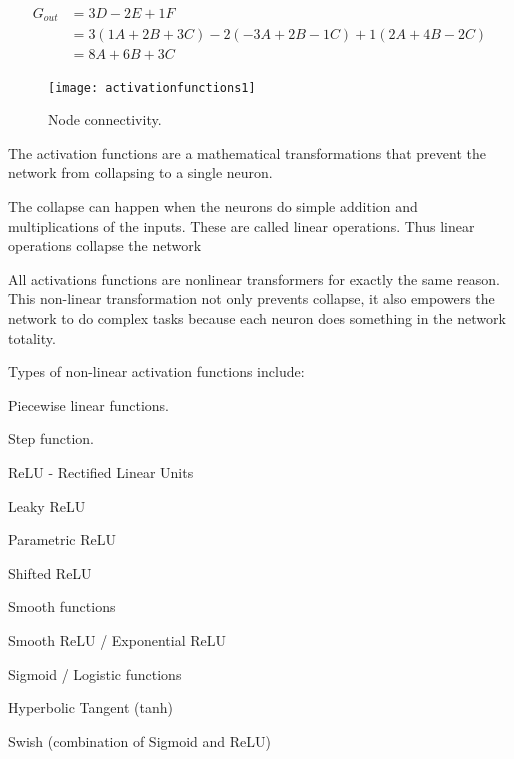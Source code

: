 	\begin{align}
		\begin{split}
		 G_{out}	& = 3D -2E + 1F	\\
				& = 3(1A + 2B + 3C) - 2(-3A + 2B -1C) + 1(2A+4B-2C)	\\
				& = 8A + 6B + 3C
		\end{split}
		\label{eq:neuronweights}
	\end{align}

 	\begin{figure}[htb]
		\centering
		\texttt{[image: activationfunctions1]}
		\caption[Node connectivity]{Node connectivity.}
		\label{fig:activationfunctions1}
	\end{figure}

	\begin{bulletedlist}
		\item The activation functions are a mathematical transformations that prevent the network from collapsing to a single neuron.
		\item The collapse can happen when the neurons do simple addition and multiplications of the inputs. These are called linear operations. Thus linear operations collapse the network
		\item All activations functions are nonlinear transformers for exactly the same reason. This non-linear transformation not only prevents collapse, it also empowers the network to do complex tasks because each neuron does something in the network totality.

		\item Types of non-linear activation functions include:
		\begin{bulletedlist}
			\item Piecewise linear functions.
			\begin{bulletedlist}
				\item Step function.
				\item ReLU - Rectified Linear Units
				\item Leaky ReLU
				\item Parametric ReLU
				\item Shifted ReLU
			\end{bulletedlist}
			\item Smooth functions
			\begin{bulletedlist}
				\item Smooth ReLU / Exponential ReLU
				\item Sigmoid / Logistic functions
				\item Hyperbolic Tangent (tanh)
				\item Swish (combination of Sigmoid and ReLU)
			\end{bulletedlist}
		\end{bulletedlist}
	\end{bulletedlist}

